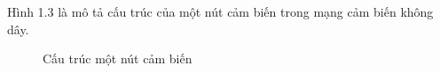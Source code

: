 Hình 1.3 là mô tả cấu trúc của một nút cảm biến trong mạng cảm biến không dây.
\linebreak 
\begin{figure}[htb]
	\caption{\label{fig:my-label} Cấu trúc một nút cảm biến}
\end{figure}

